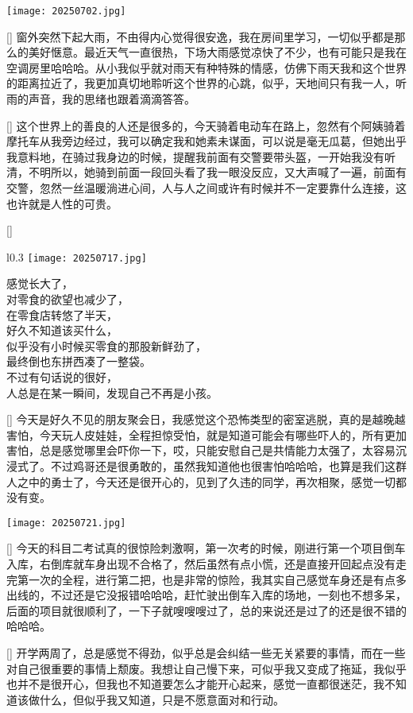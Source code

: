 \documentclass{diary}
\begin{document}
\begin{center}
    \texttt{[image: 20250702.jpg]}
\end{center}

[\rainy]%
窗外突然下起大雨，不由得内心觉得很安逸，我在房间里学习，一切似乎都是那么的美好惬意。最近天气一直很热，下场大雨感觉凉快了不少，也有可能只是我在空调房里哈哈哈。从小我似乎就对雨天有种特殊的情感，仿佛下雨天我和这个世界的距离拉近了，我更加真切地聆听这个世界的心跳，似乎，天地间只有我一人，听雨的声音，我的思绪也跟着滴滴答答。

[\simpleSmile]%
这个世界上的善良的人还是很多的，今天骑着电动车在路上，忽然有个阿姨骑着摩托车从我旁边经过，我可以确定我和她素未谋面，可以说是毫无瓜葛，但她出乎我意料地，在骑过我身边的时候，提醒我前面有交警要带头盔，一开始我没有听清，不明所以，她骑到前面一段回头看了我一眼没反应，又大声喊了一遍，前面有交警，忽然一丝温暖淌进心间，人与人之间或许有时候并不一定要靠什么连接，这也许就是人性的可贵。

[\hot]%
\vspace{-1.5em}
\setlength{\columnsep}{2em}
\begin{wrapfigure}{l}{0.3\linewidth} 
  \vspace{-0.8em}
  \texttt{[image: 20250717.jpg]} 
\end{wrapfigure}
\noindent
感觉长大了，\\
对零食的欲望也减少了，\\
在零食店转悠了半天，\\
好久不知道该买什么，\\
似乎没有小时候买零食的那股新鲜劲了，\\
最终倒也东拼西凑了一整袋。\\
不过有句话说的很好，\\
人总是在某一瞬间，发现自己不再是小孩。


[\laughing]%
今天是好久不见的朋友聚会日，我感觉这个恐怖类型的密室逃脱，真的是越晚越害怕，今天玩人皮娃娃，全程担惊受怕，就是知道可能会有哪些吓人的，所有更加害怕，总是感觉哪里会吓你一下，哎，只能安慰自己是共情能力太强了，太容易沉浸式了。不过鸡哥还是很勇敢的，虽然我知道他也很害怕哈哈哈，也算是我们这群人之中的勇士了，今天还是很开心的，见到了久违的同学，再次相聚，感觉一切都没有变。
\begin{center}
    \texttt{[image: 20250721.jpg]}
\end{center}

[\dizzy]%
今天的科目二考试真的很惊险刺激啊，第一次考的时候，刚进行第一个项目倒车入库，右倒库就车身出现不合格了，然后虽然有点小慌，还是直接开回起点没有走完第一次的全程，进行第二把，也是非常的惊险，我其实自己感觉车身还是有点多出线的，不过还是它没报错哈哈哈，赶忙驶出倒车入库的场地，一刻也不想多呆，后面的项目就很顺利了，一下子就嗖嗖嗖过了，总的来说还是过了的还是很不错的哈哈哈。

\Address[江苏][南京]
[\confused]%
开学两周了，总是感觉不得劲，似乎总是会纠结一些无关紧要的事情，而在一些对自己很重要的事情上颓废。我想让自己慢下来，可似乎我又变成了拖延，我似乎也并不是很开心，但我也不知道要怎么才能开心起来，感觉一直都很迷茫，我不知道该做什么，但似乎我又知道，只是不愿意面对和行动。
\end{document}
